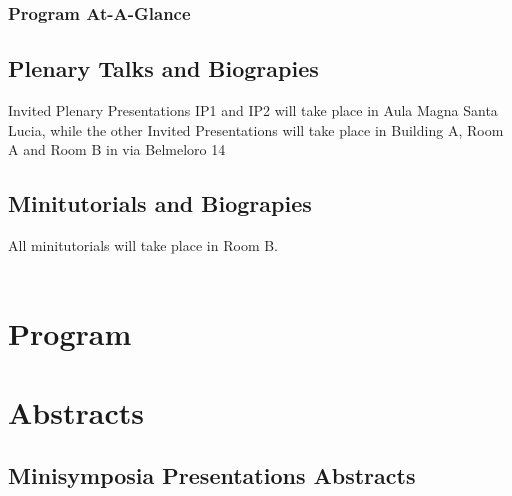 \documentclass[twoside]{book}
\begin{document}





\usechapterimagetrue
{} %
\pagestyle{empty} %

\tableofcontents %
\cleardoublepage %
\pagestyle{fancy} %

\newpage
\section*{Program At-A-Glance}




\chapter*{Plenary Talks and Biograpies}

{\Large{Invited Plenary Presentations  IP1 and IP2 will take place in Aula Magna Santa Lucia, while the other Invited Presentations will take place in Building A, Room A and Room B in via Belmeloro 14}}



\chapter*{Minitutorials and Biograpies}

{\Large{All minitutorials will take place in Room B.}}\\\\



\part{Program}


\part{Abstracts}
\chapter*{Minisymposia Presentations Abstracts}

\end{document}
